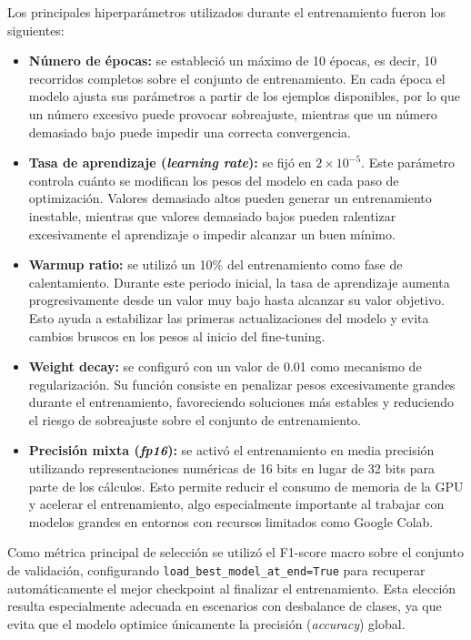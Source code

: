 Los principales hiperparámetros utilizados durante el entrenamiento fueron los siguientes:

\begin{itemize}
	\item \textbf{Número de épocas:} se estableció un máximo de 10 épocas, es decir, 10 recorridos completos sobre el conjunto de entrenamiento. En cada época el modelo ajusta sus parámetros a partir de los ejemplos disponibles, por lo que un número excesivo puede provocar sobreajuste, mientras que un número demasiado bajo puede impedir una correcta convergencia.
	
	\item \textbf{Tasa de aprendizaje (\textit{learning rate}):} se fijó en $2 \times 10^{-5}$. Este parámetro controla cuánto se modifican los pesos del modelo en cada paso de optimización. Valores demasiado altos pueden generar un entrenamiento inestable, mientras que valores demasiado bajos pueden ralentizar excesivamente el aprendizaje o impedir alcanzar un buen mínimo.
	
	\item \textbf{Warmup ratio:} se utilizó un 10\% del entrenamiento como fase de calentamiento. Durante este periodo inicial, la tasa de aprendizaje aumenta progresivamente desde un valor muy bajo hasta alcanzar su valor objetivo. Esto ayuda a estabilizar las primeras actualizaciones del modelo y evita cambios bruscos en los pesos al inicio del fine-tuning.
	
	\item \textbf{Weight decay:} se configuró con un valor de 0.01 como mecanismo de regularización. Su función consiste en penalizar pesos excesivamente grandes durante el entrenamiento, favoreciendo soluciones más estables y reduciendo el riesgo de sobreajuste sobre el conjunto de entrenamiento.
	
	\item \textbf{Precisión mixta (\textit{fp16}):} se activó el entrenamiento en media precisión utilizando representaciones numéricas de 16 bits en lugar de 32 bits para parte de los cálculos. Esto permite reducir el consumo de memoria de la \ac{GPU} y acelerar el entrenamiento, algo especialmente importante al trabajar con modelos grandes en entornos con recursos limitados como Google Colab.
\end{itemize}

Como métrica principal de selección se utilizó el F1-score macro sobre el conjunto de validación, configurando \texttt{load\_best\_model\_at\_end=True} para recuperar automáticamente el mejor checkpoint al finalizar el entrenamiento. Esta elección resulta especialmente adecuada en escenarios con desbalance de clases, ya que evita que el modelo optimice únicamente la precisión (\textit{accuracy}) global.


